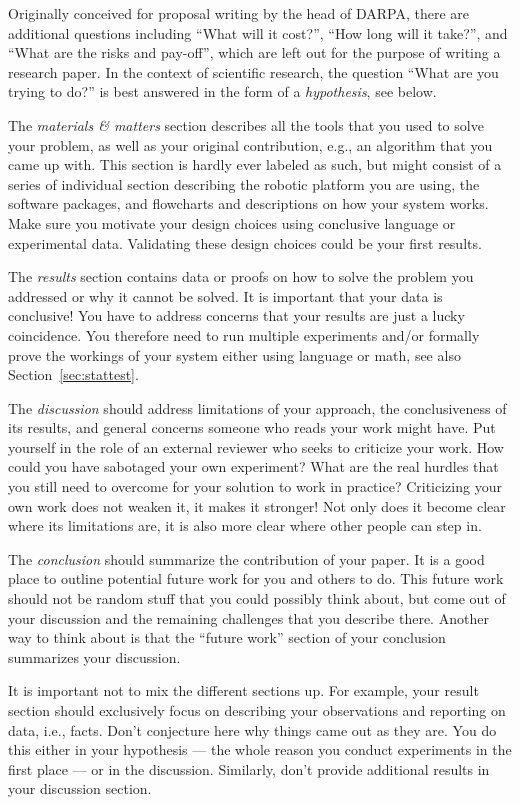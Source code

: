 \documentclass[paper=6.14in:9.21in,pagesize=pdftex,11pt,twoside,openright]{scrbook}
\begin{document}
Originally conceived for proposal writing by the head of DARPA, there are additional questions including ``What will it cost?'', ``How long will it take?'', and ``What are the risks and pay-off'', which are left out for the purpose of writing a research paper. In the context of scientific research, the question ``What are you trying to do?'' is best answered in the form of a \emph{hypothesis}, see below.

The \emph{materials \& matters} section describes all the tools that you used to solve your problem, as well as your original contribution, e.g., an algorithm that you came up with. This section is hardly ever labeled as such, but might consist of a series of individual section describing the robotic platform you are using, the software packages, and flowcharts and descriptions on how your system works. Make sure you motivate your design choices using conclusive language or experimental data. Validating these design choices could be your first results.

The \emph{results} section contains data or proofs on how to solve the problem you addressed or why it cannot be solved. It is important that your data is conclusive! You have to address concerns that your results are just a lucky coincidence. You therefore need to run multiple experiments and/or formally prove the workings of your system either using language or math, see also Section~\ref{sec:stattest}.

The \emph{discussion} should address limitations of your approach, the conclusiveness of its results, and general concerns someone who reads your work might have. Put yourself in the role of an external reviewer who seeks to criticize your work. How could you have sabotaged your own experiment? What are the real hurdles that you still need to overcome for your solution to work in practice? Criticizing your own  work does not weaken it, it makes it stronger! Not only does it become clear where its limitations are, it is also more clear where other people can step in.

The \emph{conclusion} should summarize the contribution of your paper. It is a good place to outline potential future work for you and others to do. This future work should not be random stuff that you could possibly think about, but come out of your discussion and the remaining challenges that you describe there. Another way to think about is that the ``future work'' section of your conclusion summarizes your discussion.

It is important not to mix the different sections up. For example, your result section should exclusively focus on describing your observations and reporting on data, i.e., facts. Don't conjecture here why things came out as they are. You do this either in your hypothesis --- the whole reason you conduct experiments in the first place --- or in the discussion. Similarly, don't provide additional results in your discussion section.
\end{document}
